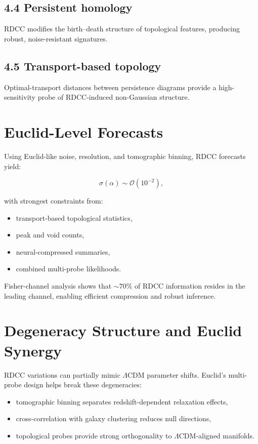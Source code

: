 \documentclass[11pt,a4paper]{article}
\begin{document}
\subsection*{4.4 Persistent homology}
RDCC modifies the birth--death structure of topological features, producing 
robust, noise-resistant signatures.

\subsection*{4.5 Transport-based topology}
Optimal-transport distances between persistence diagrams provide a 
high-sensitivity probe of RDCC-induced non-Gaussian structure.
\section{Euclid-Level Forecasts}

Using Euclid-like noise, resolution, and tomographic binning, RDCC forecasts 
yield:


\[
    \sigma(\alpha) \sim \mathcal{O}(10^{-2}),
\]


with strongest constraints from:

\begin{itemize}
    \item transport-based topological statistics,
    \item peak and void counts,
    \item neural-compressed summaries,
    \item combined multi-probe likelihoods.
\end{itemize}

Fisher-channel analysis shows that $\sim 70\%$ of RDCC information resides in 
the leading channel, enabling efficient compression and robust inference.
\section{Degeneracy Structure and Euclid Synergy}

RDCC variations can partially mimic $\Lambda$CDM parameter shifts. Euclid's 
multi-probe design helps break these degeneracies:

\begin{itemize}
    \item tomographic binning separates redshift-dependent relaxation effects,
    \item cross-correlation with galaxy clustering reduces null directions,
    \item topological probes provide strong orthogonality to $\Lambda$CDM-aligned manifolds.
\end{itemize}
\end{document}
